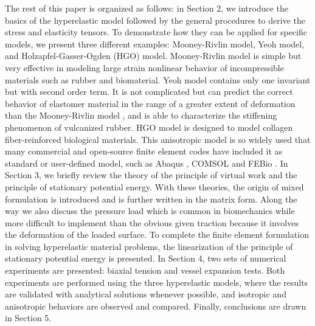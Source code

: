 The rest of this paper is organized as follows: in Section 2, we introduce the basics of the hyperelastic model followed by the general procedures to derive the stress and elasticity tensors. To demonstrate how they can be applied for specific models, we present three different examples: Mooney-Rivlin model, Yeoh model, and Holzapfel-Gasser-Ogden (HGO) model. Mooney-Rivlin model is simple but very effective in modeling large strain nonlinear behavior of incompressible materials such as rubber and biomaterial. Yeoh model contains only one invariant but with second order term. It is not complicated but can predict the correct behavior of elastomer material in the range of a greater extent of deformation than the Mooney-Rivlin model \cite{Gajewski}, and is able to characterize the stiffening phenomenon of vulcanized rubber. HGO model is designed to model collagen fiber-reinforced biological materials. This anisotropic model is so widely used that many commercial and open-source finite element codes have included it as standard or user-defined model,  such as Abaqus \cite{Abaqus}, COMSOL \cite{COMSOL} and FEBio \cite{FEBio}. In Section 3, we briefly review the theory of the principle of virtual work and the principle of stationary potential energy. With these theories, the origin of mixed formulation is introduced and is further written in the matrix form. Along the way we also discuss the pressure load which is common in biomechanics while more difficult to implement than the obvious given traction because it involves the deformation of the loaded surface. To complete the finite element formulation in solving hyperelastic material problems, the linearization of the principle of stationary potential energy is presented. In Section 4, two sets of numerical experiments are presented: biaxial tension and vessel expansion tests. Both experiments are performed using the three hyperelastic models, where the results are validated with analytical solutions whenever possible, and isotropic and anisotropic behaviors are observed and compared. Finally, conclusions are drawn in Section 5.




 



